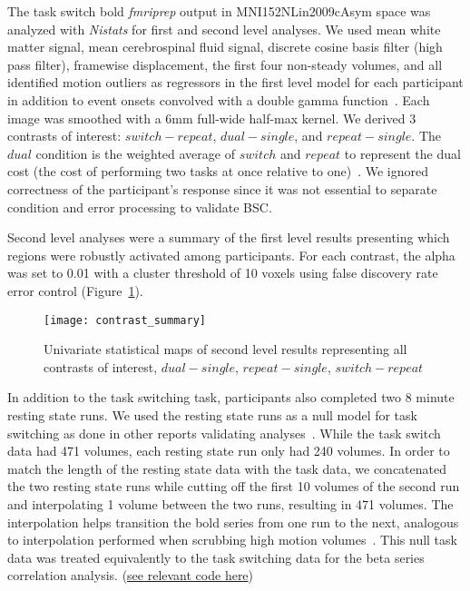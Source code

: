 \documentclass[phd,figures,tables,ackpage,abstractpage,publicabstractpage]{uithesis}
\begin{document}
The task switch bold \emph{fmriprep} output in MNI152NLin2009cAsym space
was analyzed with \emph{Nistats} for first and second level analyses.
We used mean white matter signal, mean cerebrospinal fluid signal,
discrete cosine basis filter (high pass filter), framewise displacement, the first four non-steady volumes, and
all identified motion outliers as regressors in the first level model for each participant
in addition to event onsets convolved with a double gamma function~\cite{Glover1999}.
Each image was smoothed with a 6mm full-wide half-max kernel.
We derived 3 contrasts of interest: $switch - repeat$, $dual- single$, and $repeat - single$.
The $dual$ condition is the weighted average of $switch$ and $repeat$ to represent the
dual cost (the cost of performing two tasks at once relative to one)~\cite{Wylie2000,Verhaeghen2003}.
We ignored correctness of the participant's response since it was not essential to
separate condition and error processing to validate BSC.

Second level analyses were a summary of the first level results presenting which
regions were robustly activated among participants.
For each contrast, the alpha was set to 0.01 with a cluster threshold of 10 voxels using
false discovery rate error control (Figure~\ref{fig:stat_maps}).

\begin{figure}[H]
  \centering
  \texttt{[image: contrast\_summary]}
  \caption[Univariate statistical maps]{
    Univariate statistical maps of second level results representing
    all contrasts of interest, $dual - single$, $repeat - single$, $switch - repeat$}
  \label{fig:stat_maps}
\end{figure}

In addition to the task switching task, participants also completed
two 8 minute resting state runs.
We used the resting state runs as a null model for task switching as done
in other reports validating analyses~\cite{Eklund2016,Olszowy2019}.
While the task switch data had 471 volumes, each resting state run only had
240 volumes.
In order to match the length of the resting state data with the task data, we concatenated
the two resting state runs while cutting off the first 10 volumes of the second run
and interpolating 1 volume between the two runs, resulting in 471 volumes.
The interpolation helps transition the bold series from one run to the next,
analogous to interpolation performed when scrubbing high motion volumes~\cite{Power2014a}. 
This null task data was treated equivalently to the task switching data for the
beta series correlation analysis.
(\href{https://github.com/jdkent/validateBetaSeries/tree/195ad5b4201971038dbbf8f73a3c537caf032743}{see relevant code here})
\end{document}
